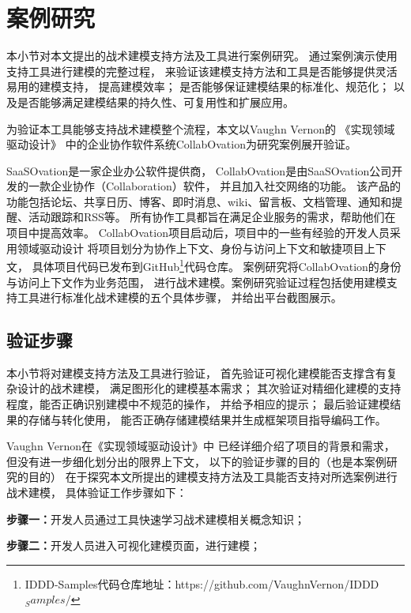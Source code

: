\section{案例研究}

本小节对本文提出的战术建模支持方法及工具进行案例研究。
通过案例演示使用支持工具进行建模的完整过程，
来验证该建模支持方法和工具是否能够提供灵活易用的建模支持，
提高建模效率；
是否能够保证建模结果的标准化、规范化；
以及是否能够满足建模结果的持久性、可复用性和扩展应用。

为验证本工具能够支持战术建模整个流程，本文以Vaughn Vernon的
《实现领域驱动设计》\cite{vernon2013implementing}
中的企业协作软件系统CollabOvation为研究案例展开验证。

SaaSOvation是一家企业办公软件提供商，
CollabOvation是由SaaSOvation公司开发的一款企业协作（Collaboration）软件，
并且加入社交网络的功能。
该产品的功能包括论坛、共享日历、博客、即时消息、wiki、留言板、文档管理、通知和提醒、活动跟踪和RSS等。
所有协作工具都旨在满足企业服务的需求，帮助他们在项目中提高效率。
CollabOvation项目启动后，项目中的一些有经验的开发人员采用领域驱动设计
将项目划分为协作上下文、身份与访问上下文和敏捷项目上下文，
具体项目代码已发布到GitHub\footnote{IDDD-Samples代码仓库地址：https://github.com/VaughnVernon/IDDD$_Samples/$}代码仓库。
案例研究将CollabOvation的身份与访问上下文作为业务范围，
进行战术建模。案例研究验证过程包括使用建模支持工具进行标准化战术建模的五个具体步骤，
并给出平台截图展示。



\subsection{验证步骤}

本小节将对建模支持方法及工具进行验证，
首先验证可视化建模能否支撑含有复杂设计的战术建模，
满足图形化的建模基本需求；
其次验证对精细化建模的支持程度，能否正确识别建模中不规范的操作，
并给予相应的提示；
最后验证建模结果的存储与转化使用，
能否正确存储建模结果并生成框架项目指导编码工作。

Vaughn Vernon在《实现领域驱动设计》\cite{vernon2013implementing}中
已经详细介绍了项目的背景和需求，
但没有进一步细化划分出的限界上下文，
以下的验证步骤的目的（也是本案例研究的目的）
在于探究本文所提出的建模支持方法及工具能否支持对所选案例进行战术建模，
具体验证工作步骤如下：

\textbf{步骤一：}开发人员通过工具快速学习战术建模相关概念知识；

\textbf{步骤二：}开发人员进入可视化建模页面，进行建模；

